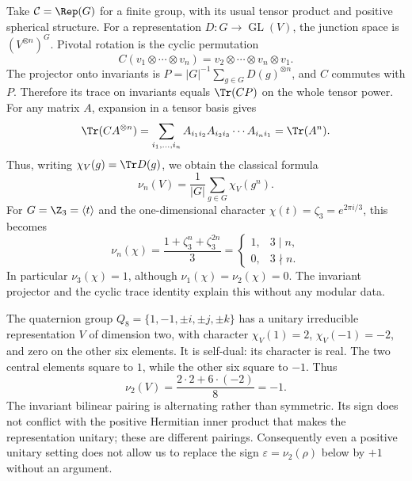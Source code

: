 \begin{example}
Take $\mathcal C=\Rep(G)$ for a finite group, with its usual tensor
product and positive spherical structure. For a representation
$D:G\to\operatorname{GL}(V)$, the junction space is
$(V^{\otimes n})^G$. Pivotal rotation is the cyclic permutation
\[
 C(v_1\otimes\cdots\otimes v_n)
   =v_2\otimes\cdots\otimes v_n\otimes v_1.
\]
The projector onto invariants is
$P=|G|^{-1}\sum_{g\in G}D(g)^{\otimes n}$, and $C$ commutes with
$P$. Therefore its trace on invariants equals $\Tr(CP)$ on the
whole tensor power. For any matrix $A$, expansion in a tensor basis
gives
\[
 \Tr(CA^{\otimes n})
 =\sum_{i_1,\ldots,i_n}
    A_{i_1i_2}A_{i_2i_3}\cdots A_{i_ni_1}
 =\Tr(A^n).
\]
Thus, writing $\chi_V(g)=\Tr D(g)$, we obtain the classical formula
\begin{equation}\label{eq:c-group-indicator}
 \nu_n(V)=\frac1{|G|}\sum_{g\in G}\chi_V(g^n).
\end{equation}
For $G=\Z_3=\langle t\rangle$ and the one-dimensional character
$\chi(t)=\zeta_3=e^{2\pi i/3}$, this becomes
\[
 \nu_n(\chi)=\frac{1+\zeta_3^n+\zeta_3^{2n}}3
 =\begin{cases}1,&3\mid n,\\0,&3\nmid n.\end{cases}
\]
In particular $\nu_3(\chi)=1$, although $\nu_1(\chi)=\nu_2(\chi)=0$.
The invariant projector and the cyclic trace identity explain this
without any modular data.
\end{example}

\begin{example}
The quaternion group $Q_8=\{1,-1,\pm i,\pm j,\pm k\}$ has a
unitary irreducible representation $V$ of dimension two, with character
$\chi_V(1)=2$, $\chi_V(-1)=-2$, and zero on the other six elements.
It is self-dual: its character is real. The two central elements
square to $1$, while the other six square to $-1$. Thus
\[
 \nu_2(V)=\frac{2\cdot2+6\cdot(-2)}8=-1.
\]
The invariant bilinear pairing is alternating rather than symmetric.
Its sign does not conflict with the positive Hermitian inner product
that makes the representation unitary; these are different pairings.
Consequently even a positive unitary setting does not allow us to
replace the sign $\varepsilon=\nu_2(\rho)$ below by $+1$ without
an argument.
\end{example}

